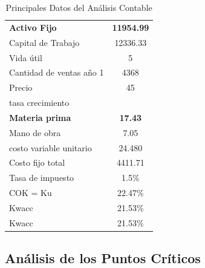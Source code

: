 \documentclass[a4paper,openright,12pt]{book}
\begin{document}
\begin{table}[H]
\begin{tabular}{lc}
\textbf{Activo Fijo}       & \textbf{11954.99} \\
Capital de Trabajo         & 12336.33          \\
Vida útil                  & 5                 \\
Cantidad de ventas   año 1 & 4368              \\
Precio                     & 45                \\
tasa   crecimiento         &                   \\
\textbf{Materia prima}     & \textbf{17.43}    \\
Mano de obra               & 7.05              \\
costo variable   unitario  & 24.480            \\
Costo fijo total           & 4411.71           \\
Tasa de   impuesto         & 1.5\%             \\
COK = Ku                   & 22.47\%           \\
Kwacc                      & 21.53\%           \\
Kwacc                      & 21.53\%          
\end{tabular}
\caption{Principales Datos del Análisis Contable}
\label{Tabla18}
\end{table}


\subsection{Análisis de los Puntos Críticos}
\end{document}
